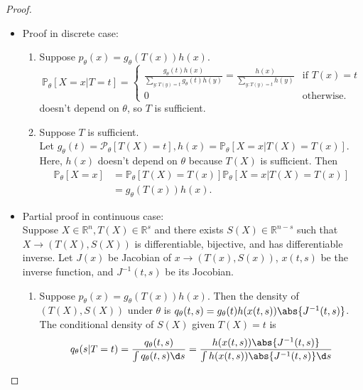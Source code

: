 \documentclass[a4paper]{article}
\begin{document}
\begin{proof}
	\quad
	\begin{itemize}[leftmargin=*]
		\item Proof in discrete case:
			\begin{enumerate}
				\item Suppose $p_\theta(x) = g_\theta(T(x))h(x)$.
				\begin{equation}
					\mathbb{P}_\theta[X=x|T=t]
					= \left\{ \begin{array}{ll}
						\frac{g_\theta(t)h(x)}{\sum\limits_{y:T(y)=t}g_\theta(t)h(y)} = \frac{h(x)}{\sum\limits_{y:T(y)=t}h(y)} & \text{if } T(x) = t \\ 0 & \text{otherwise.} 
					\end{array} \right .
				\end{equation}
				doesn't depend on $\theta$, so $T$ is sufficient.
				\item Suppose $T$ is sufficient. \\
				Let $g_\theta(t) = \mathcal{P}_\theta[T(X) = t], h(x) = \mathbb{P}_\theta[X=x|T(X) = T(x)]$. Here, $h(x)$ doesn't depend on $\theta$ because $T(X)$ is sufficient. Then
				\begin{equation}
					\begin{aligned}
						\mathbb{P}_\theta[X=x] &= \mathbb{P}_\theta[T(X)=T(x)]\mathbb{P}_\theta[X=x|T(X)=T(x)] \\
						&= g_\theta(T(x))h(x).
					\end{aligned}
				\end{equation}
			\end{enumerate}
	 \item Partial proof in continuous case:\\
		Suppose $X \in \mathbb{R}^n, T(X) \in \mathbb{R}^s$ and there exists $S(X) \in \mathbb{R}^{n-s}$ such that $X \to (T(X),S(X))$ is differentiable, bijective, and has differentiable inverse. Let $J(x)$ be Jacobian of $x \to (T(x),S(x))$, $x(t,s)$ be the inverse function, and $J^{-1}(t,s)$ be its Jocobian.
		\begin{enumerate}
			\item Suppose $p_\theta(x) = g_\theta(T(x))h(x)$. Then the density of $(T(X),S(X))$ under $\theta$ is $q_\theta(t,s)=g_\theta(t)h(x(t,s))\abs{J^{-1}(t,s)}$. The conditional density of $S(X)$ given $T(X) = t$ is
			\begin{equation}
				q_\theta(s|T=t) = \frac{q_\theta(t,s)}{\int q_\theta(t,s) \d s} = \frac{h(x(t,s))\abs{J^{-1}(t,s)}}{\int h(x(t,s)) \abs{J^{-1}(t,s)}\d s}

\end{equation}
\end{enumerate}
\end{itemize}
\end{proof}
\end{document}
